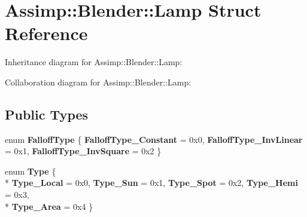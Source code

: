 \hypertarget{struct_assimp_1_1_blender_1_1_lamp}{\section{Assimp\+:\+:Blender\+:\+:Lamp Struct Reference}
\label{struct_assimp_1_1_blender_1_1_lamp}
}


Inheritance diagram for Assimp\+:\+:Blender\+:\+:Lamp\+:


Collaboration diagram for Assimp\+:\+:Blender\+:\+:Lamp\+:
\subsection*{Public Types}
\begin{DoxyCompactItemize}
\item 
\hypertarget{struct_assimp_1_1_blender_1_1_lamp_a61e9046b808d12f92e689e472e9fbb8c}{enum {\bfseries Falloff\+Type} \{ {\bfseries Falloff\+Type\+\_\+\+Constant} = 0x0, 
{\bfseries Falloff\+Type\+\_\+\+Inv\+Linear} = 0x1, 
{\bfseries Falloff\+Type\+\_\+\+Inv\+Square} = 0x2
 \}}\label{struct_assimp_1_1_blender_1_1_lamp_a61e9046b808d12f92e689e472e9fbb8c}

\item 
\hypertarget{struct_assimp_1_1_blender_1_1_lamp_ae05747852bdfafca6fd2cc86a71e7ec4}{enum {\bfseries Type} \{ \\*
{\bfseries Type\+\_\+\+Local} = 0x0, 
{\bfseries Type\+\_\+\+Sun} = 0x1, 
{\bfseries Type\+\_\+\+Spot} = 0x2, 
{\bfseries Type\+\_\+\+Hemi} = 0x3, 
\\*
{\bfseries Type\+\_\+\+Area} = 0x4
 \}}\label{struct_assimp_1_1_blender_1_1_lamp_ae05747852bdfafca6fd2cc86a71e7ec4}

\end{DoxyCompactItemize}
